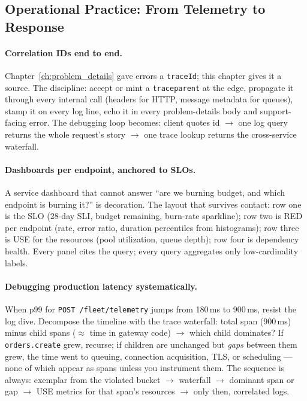 \subsection{Operational Practice: From Telemetry to Response}
\label{subsec:ch18-ops}

\paragraph{Correlation IDs end to end.} Chapter~\ref{ch:problem_details}
gave errors a \texttt{traceId}; this chapter gives it a source. The
discipline: accept or mint a \texttt{traceparent} at the edge, propagate it
through every internal call (headers for HTTP, message metadata for
queues), stamp it on every log line, echo it in every problem-details body
and support-facing error. The debugging loop becomes: client quotes id
$\to$ one log query returns the whole request's story $\to$ one trace
lookup returns the cross-service waterfall.

\paragraph{Dashboards per endpoint, anchored to SLOs.} A service dashboard
that cannot answer ``are we burning budget, and which endpoint is burning
it?'' is decoration. The layout that survives contact: row one is the SLO
(28-day SLI, budget remaining, burn-rate sparkline); row two is RED per
endpoint (rate, error ratio, duration percentiles from histograms); row
three is USE for the resources (pool utilization, queue depth); row four is
dependency health. Every panel cites the query; every query aggregates
only low-cardinality labels.

\paragraph{Debugging production latency systematically.} When p99 for
\texttt{POST /fleet/telemetry} jumps from 180\,ms to 900\,ms, resist the
log dive. Decompose the timeline with the trace waterfall: total span
(900\,ms) minus child spans ($\approx$ time in gateway code) $\to$ which
child dominates? If \texttt{orders.create} grew, recurse; if children are
unchanged but \emph{gaps} between them grew, the time went to queuing,
connection acquisition, TLS, or scheduling --- none of which appear as
spans unless you instrument them. The sequence is always: exemplar from
the violated bucket $\to$ waterfall $\to$ dominant span or gap $\to$
USE metrics for that span's resources $\to$ only then, correlated logs.

